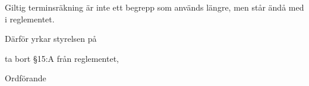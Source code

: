\documentclass[../_main/handlingar.tex]{subfiles}
\begin{document}

Giltig terminsräkning är inte ett begrepp som används längre, men står ändå med i reglementet.

Därför yrkar styrelsen på

\begin{attsatser}
    \att ta bort \S15:A från reglementet,
\end{attsatser}

\begin{signatures}{1}
    \ist
    \signature{\ordf}{Ordförande}
\end{signatures}
\end{document}

